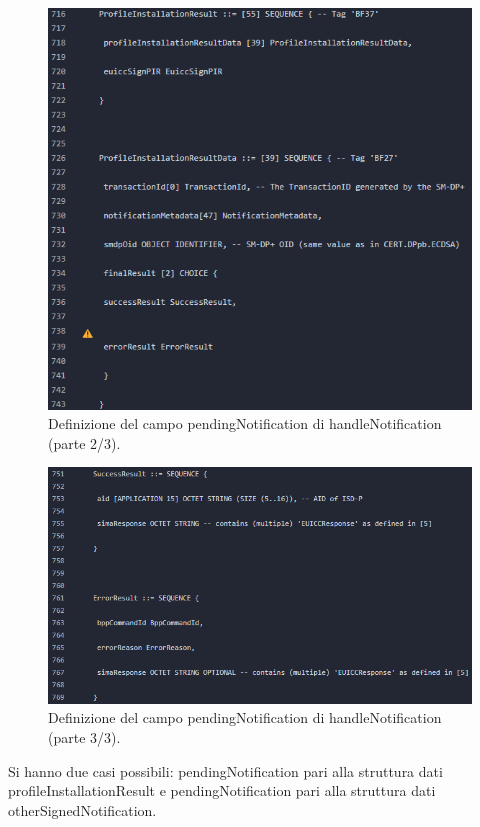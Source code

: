 \documentclass[10pt, oneside]{book}
\begin{document}
\begin{figure}
\includegraphics[width=\linewidth]{def-pendingNotification2.png}
\caption{Definizione del campo pendingNotification di handleNotification (parte 2/3).}
\label{fig:def-pendingNotification2}
\end{figure}
\begin{figure}
\includegraphics[width=\linewidth]{def-pendingNotification3.png}
\caption{Definizione del campo pendingNotification di handleNotification (parte 3/3).}
\label{fig:def-pendingNotification3}
\end{figure}
Si hanno due casi possibili: pendingNotification pari alla struttura dati profileInstallationResult e pendingNotification pari alla struttura dati otherSignedNotification.
\end{document}
